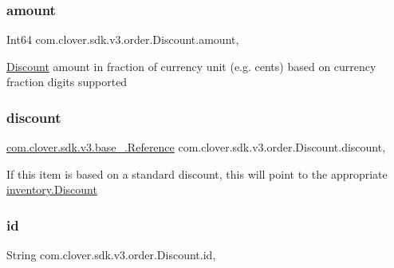 \subsubsection{\texorpdfstring{amount}{amount}}
{\footnotesize\ttfamily Int64 com.\+clover.\+sdk.\+v3.\+order.\+Discount.\+amount\hspace{0.3cm}{\ttfamily [get]}, {\ttfamily [set]}}



\hyperlink{classcom_1_1clover_1_1sdk_1_1v3_1_1order_1_1_discount}{Discount} amount in fraction of currency unit (e.\+g. cents) based on currency fraction digits supported 

\mbox{\label{classcom_1_1clover_1_1sdk_1_1v3_1_1order_1_1_discount_a6447f1e7eef9a5c388bf904b5cc1e8c8}} 
\subsubsection{\texorpdfstring{discount}{discount}}
{\footnotesize\ttfamily \hyperlink{classcom_1_1clover_1_1sdk_1_1v3_1_1base___1_1_reference}{com.\+clover.\+sdk.\+v3.\+base\+\_\+.\+Reference} com.\+clover.\+sdk.\+v3.\+order.\+Discount.\+discount\hspace{0.3cm}{\ttfamily [get]}, {\ttfamily [set]}}



If this item is based on a standard discount, this will point to the appropriate \hyperlink{classcom_1_1clover_1_1sdk_1_1v3_1_1inventory_1_1_discount}{inventory.\+Discount} 

\mbox{\label{classcom_1_1clover_1_1sdk_1_1v3_1_1order_1_1_discount_aa2c3e145ab182c1f49c2a6f865365981}} 
\subsubsection{\texorpdfstring{id}{id}}
{\footnotesize\ttfamily String com.\+clover.\+sdk.\+v3.\+order.\+Discount.\+id\hspace{0.3cm}{\ttfamily [get]}, {\ttfamily [set]}}



